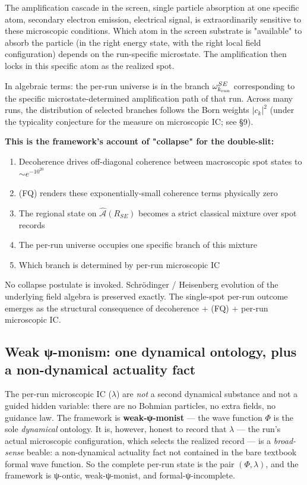 \documentclass[11pt,a4paper]{article}
\begin{document}
The amplification cascade in the screen, single particle absorption at one specific atom, secondary electron emission, electrical signal, is extraordinarily sensitive to these microscopic conditions. Which atom in the screen substrate is "available" to absorb the particle (in the right energy state, with the right local field configuration) depends on the run-specific microstate. The amplification then locks in this specific atom as the realized spot.

In algebraic terms: the per-run universe is in the branch $\omega_{k_{\rm run}}^{SE}$ corresponding to the specific microstate-determined amplification path of that run. Across many runs, the distribution of selected branches follows the Born weights $|c_k|^2$ (under the typicality conjecture for the measure on microscopic IC; see §9).

\textbf{This is the framework's account of "collapse" for the double-slit:}
\begin{enumerate}
  \item Decoherence drives off-diagonal coherence between macroscopic spot states to $\sim e^{-10^{20}}$
  \item (FQ) renders these exponentially-small coherence terms physically zero
  \item The regional state on $\hat{\mathcal{A}}(R_{SE})$ becomes a strict classical mixture over spot records
  \item The per-run universe occupies one specific branch of this mixture
  \item Which branch is determined by per-run microscopic IC
\end{enumerate}

No collapse postulate is invoked. Schrödinger / Heisenberg evolution of the underlying field algebra is preserved exactly. The single-spot per-run outcome emerges as the structural consequence of decoherence + (FQ) + per-run microscopic IC.

\subsection{Weak ψ-monism: one dynamical ontology, plus a non-dynamical actuality fact}

The per-run microscopic IC ($\lambda$) are \emph{not} a second dynamical substance and not a guided hidden variable: there are no Bohmian particles, no extra fields, no guidance law. The framework is \textbf{weak-ψ-monist} — the wave function $\Phi$ is the sole \emph{dynamical} ontology. It is, however, honest to record that $\lambda$ — the run's actual microscopic configuration, which selects the realized record — is a \emph{broad-sense} beable: a non-dynamical actuality fact not contained in the bare textbook formal wave function. So the complete per-run state is the pair $(\Phi, \lambda)$, and the framework is ψ-ontic, weak-ψ-monist, and formal-ψ-incomplete.
\end{document}
